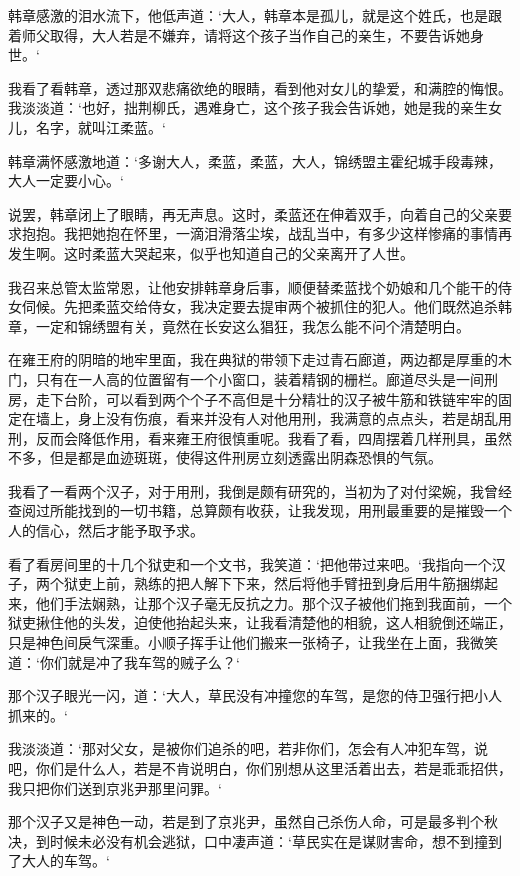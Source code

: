 韩章感激的泪水流下，他低声道：‘大人，韩章本是孤儿，就是这个姓氏，也是跟着师父取得，大人若是不嫌弃，请将这个孩子当作自己的亲生，不要告诉她身世。‘

我看了看韩章，透过那双悲痛欲绝的眼睛，看到他对女儿的挚爱，和满腔的悔恨。我淡淡道：‘也好，拙荆柳氏，遇难身亡，这个孩子我会告诉她，她是我的亲生女儿，名字，就叫江柔蓝。‘

韩章满怀感激地道：‘多谢大人，柔蓝，柔蓝，大人，锦绣盟主霍纪城手段毒辣，大人一定要小心。‘

说罢，韩章闭上了眼睛，再无声息。这时，柔蓝还在伸着双手，向着自己的父亲要求抱抱。我把她抱在怀里，一滴泪滑落尘埃，战乱当中，有多少这样惨痛的事情再发生啊。这时柔蓝大哭起来，似乎也知道自己的父亲离开了人世。

我召来总管太监常恩，让他安排韩章身后事，顺便替柔蓝找个奶娘和几个能干的侍女伺候。先把柔蓝交给侍女，我决定要去提审两个被抓住的犯人。他们既然追杀韩章，一定和锦绣盟有关，竟然在长安这么猖狂，我怎么能不问个清楚明白。

在雍王府的阴暗的地牢里面，我在典狱的带领下走过青石廊道，两边都是厚重的木门，只有在一人高的位置留有一个小窗口，装着精钢的栅栏。廊道尽头是一间刑房，走下台阶，可以看到两个个子不高但是十分精壮的汉子被牛筋和铁链牢牢的固定在墙上，身上没有伤痕，看来并没有人对他用刑，我满意的点点头，若是胡乱用刑，反而会降低作用，看来雍王府很慎重呢。我看了看，四周摆着几样刑具，虽然不多，但是都是血迹斑斑，使得这件刑房立刻透露出阴森恐惧的气氛。

我看了一看两个汉子，对于用刑，我倒是颇有研究的，当初为了对付梁婉，我曾经查阅过所能找到的一切书籍，总算颇有收获，让我发现，用刑最重要的是摧毁一个人的信心，然后才能予取予求。

看了看房间里的十几个狱吏和一个文书，我笑道：‘把他带过来吧。‘我指向一个汉子，两个狱吏上前，熟练的把人解下下来，然后将他手臂扭到身后用牛筋捆绑起来，他们手法娴熟，让那个汉子毫无反抗之力。那个汉子被他们拖到我面前，一个狱吏揪住他的头发，迫使他抬起头来，让我看清楚他的相貌，这人相貌倒还端正，只是神色间戾气深重。小顺子挥手让他们搬来一张椅子，让我坐在上面，我微笑道：‘你们就是冲了我车驾的贼子么？‘

那个汉子眼光一闪，道：‘大人，草民没有冲撞您的车驾，是您的侍卫强行把小人抓来的。‘

我淡淡道：‘那对父女，是被你们追杀的吧，若非你们，怎会有人冲犯车驾，说吧，你们是什么人，若是不肯说明白，你们别想从这里活着出去，若是乖乖招供，我只把你们送到京兆尹那里问罪。‘

那个汉子又是神色一动，若是到了京兆尹，虽然自己杀伤人命，可是最多判个秋决，到时候未必没有机会逃狱，口中凄声道：‘草民实在是谋财害命，想不到撞到了大人的车驾。‘

